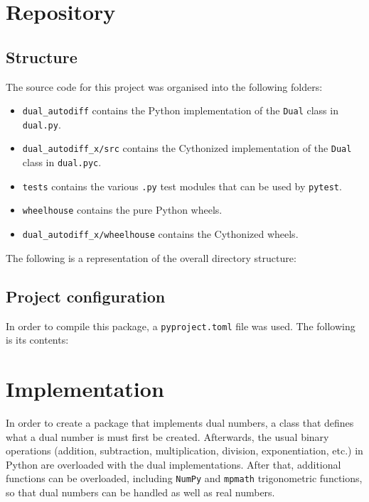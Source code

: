 \documentclass[11pt,a4paper]{article}
\begin{document}
\section{Repository}
\subsection{Structure}
The source code for this project was organised into the following folders:

\begin{itemize}
    \item \texttt{dual\_autodiff} contains the Python implementation of the \texttt{Dual} class in \texttt{dual.py}.
    \item \texttt{dual\_autodiff\_x/src} contains the Cythonized implementation of the \texttt{Dual} class in \texttt{dual.pyc}.
    \item \texttt{tests} contains the various \texttt{.py} test modules that can be used by \texttt{pytest}.
    \item \texttt{wheelhouse} contains the pure Python wheels.
    \item \texttt{dual\_autodiff\_x/wheelhouse} contains the Cythonized wheels.
\end{itemize}
\newpage
The following is a representation of the overall directory structure:


\subsection{Project configuration}
In order to compile this package, a \texttt{pyproject.toml} file was used. The following is its contents:

\newpage
\section{Implementation}
In order to create a package that implements dual numbers, a class that defines what a dual number is must first be created. Afterwards, the usual binary operations (addition, subtraction, multiplication, division, exponentiation, etc.) in Python are overloaded with the dual implementations. After that, additional functions can be overloaded, including \texttt{NumPy} and \texttt{mpmath} trigonometric functions, so that dual numbers can be handled as well as real numbers. 
\end{document}
